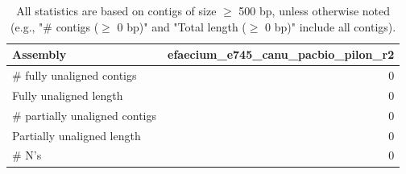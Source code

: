 \documentclass[12pt,a4paper]{article}
\begin{document}
\begin{table}[ht]
\begin{center}
\caption{All statistics are based on contigs of size $\geq$ 500 bp, unless otherwise noted (e.g., "\# contigs ($\geq$ 0 bp)" and "Total length ($\geq$ 0 bp)" include all contigs).}
\begin{tabular}{|l*{1}{|r}|}
\hline
Assembly & efaecium\_e745\_canu\_pacbio\_pilon\_r2 \\ \hline
\# fully unaligned contigs & 0 \\ \hline
Fully unaligned length & 0 \\ \hline
\# partially unaligned contigs & 0 \\ \hline
Partially unaligned length & 0 \\ \hline
\# N's & 0 \\ \hline
\end{tabular}
\end{center}
\end{table}
\end{document}
